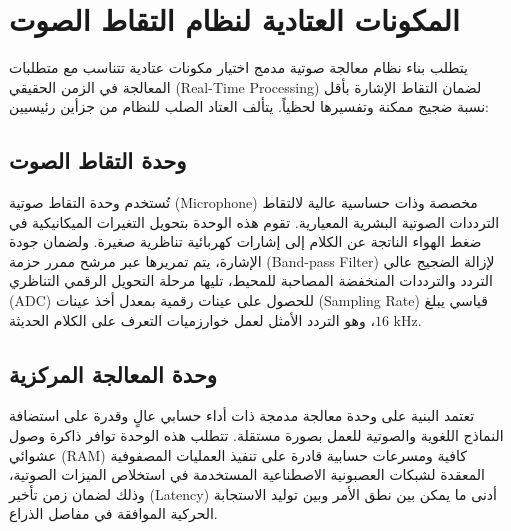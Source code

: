 \section{المكونات العتادية لنظام التقاط الصوت}
يتطلب بناء نظام معالجة صوتية مدمج اختيار مكونات عتادية تتناسب مع متطلبات المعالجة في الزمن الحقيقي (\textenglish{Real-Time Processing}) لضمان التقاط الإشارة بأقل نسبة ضجيج ممكنة وتفسيرها لحظياً. يتألف العتاد الصلب للنظام من جزأين رئيسيين:

\subsection{وحدة التقاط الصوت}
تُستخدم وحدة التقاط صوتية (\textenglish{Microphone}) مخصصة وذات حساسية عالية لالتقاط الترددات الصوتية البشرية المعيارية. تقوم هذه الوحدة بتحويل التغيرات الميكانيكية في ضغط الهواء الناتجة عن الكلام إلى إشارات كهربائية تناظرية صغيرة. ولضمان جودة الإشارة، يتم تمريرها عبر مرشح ممرر حزمة (\textenglish{Band-pass Filter}) لإزالة الضجيج عالي التردد والترددات المنخفضة المصاحبة للمحيط، تليها مرحلة التحويل الرقمي التناظري (\textenglish{ADC}) للحصول على عينات رقمية بمعدل أخذ عينات (\textenglish{Sampling Rate}) قياسي يبلغ $16\text{ kHz}$، وهو التردد الأمثل لعمل خوارزميات التعرف على الكلام الحديثة.

\subsection{وحدة المعالجة المركزية}
تعتمد البنية على وحدة معالجة مدمجة ذات أداء حسابي عالٍ وقدرة على استضافة النماذج اللغوية والصوتية للعمل بصورة مستقلة. تتطلب هذه الوحدة توافر ذاكرة وصول عشوائي (\textenglish{RAM}) كافية ومسرعات حسابية قادرة على تنفيذ العمليات المصفوفية المعقدة لشبكات العصبونية الاصطناعية المستخدمة في استخلاص الميزات الصوتية، وذلك لضمان زمن تأخير (\textenglish{Latency}) أدنى ما يمكن بين نطق الأمر وبين توليد الاستجابة الحركية الموافقة في مفاصل الذراع.